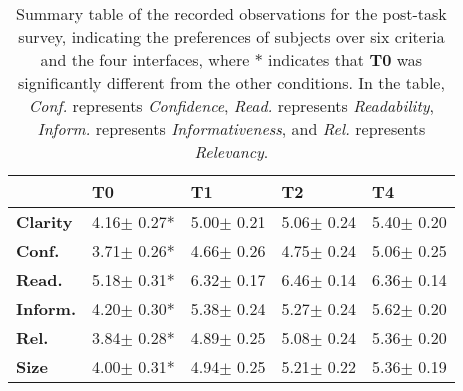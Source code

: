 \begin{table}[t]
    \caption{Summary table of the recorded observations for the post-task survey, indicating the preferences of subjects over six criteria and the four interfaces, where $*$ indicates that \textbf{T0}  was significantly different from the other conditions. In the table, \emph{Conf.} represents \emph{Confidence}, \emph{Read.} represents \emph{Readability}, \emph{Inform.} represents \emph{Informativeness}, and \emph{Rel.} represents \emph{Relevancy}.\vspace{-3mm}}
    \label{tbl_task}
    \renewcommand{\arraystretch}{1.4}
    \begin{center}
    \begin{tabulary}{\textwidth}{L{1cm}||D{1.4cm}|D{1.4cm}|D{1.4cm}|D{1.4cm}}
    \hline
    & \textbf{T0} & \textbf{T1} & \textbf{T2} & \textbf{T4}  \\ \hline\hline

\textbf{Clarity} & 4.16$\pm$ 0.27* & 5.00$\pm$ 0.21 & 5.06$\pm$ 0.24 & 5.40$\pm$ 0.20 \\ \hline
\textbf{Conf.} & 3.71$\pm$ 0.26* & 4.66$\pm$ 0.26 & 4.75$\pm$ 0.24 & 5.06$\pm$ 0.25 \\ \hline
\textbf{Read.} & 5.18$\pm$ 0.31* & 6.32$\pm$ 0.17 & 6.46$\pm$ 0.14 & 6.36$\pm$ 0.14 \\ \hline
\textbf{Inform.} & 4.20$\pm$ 0.30* & 5.38$\pm$ 0.24 & 5.27$\pm$ 0.24 & 5.62$\pm$ 0.20 \\ \hline
\textbf{Rel.} & 3.84$\pm$ 0.28* & 4.89$\pm$ 0.25 & 5.08$\pm$ 0.24 & 5.36$\pm$ 0.20 \\ \hline
\textbf{Size} & 4.00$\pm$ 0.31* & 4.94$\pm$ 0.25 & 5.21$\pm$ 0.22 & 5.36$\pm$ 0.19 \\ \hline
\end{tabulary}
\end{center}
\vspace{-2mm}
\end{table}

